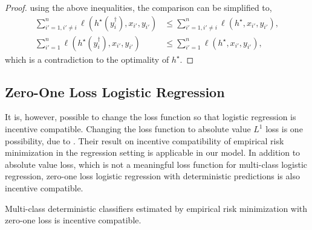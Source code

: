 \documentclass{article}
\begin{document}
\begin{proof}
using the above inequalities, the comparison can be simplified to,
\begin{align*}
\displaystyle\sum_{i'=1, i' \neq  i}^{n} \ell\left(h^\star \left(y^{\dagger}_{i}\right), x_{i'}, y_{i'}\right) &\leq  \displaystyle\sum_{i'=1, i' \neq  i}^{n} \ell\left(h^\star , x_{i'}, y_{i'}\right),
\\ \displaystyle\sum_{i'=1}^{n} \ell\left(h^\star \left(y^{\dagger}_{i}\right), x_{i'}, y_{i'}\right) &\leq  \displaystyle\sum_{i'=1}^{n} \ell\left(h^\star , x_{i'}, y_{i'}\right),
\end{align*}
which is a contradiction to the optimality of $h^\star $.
\newline \newline\end{proof}


\subsection{Zero-One Loss Logistic Regression}
It is, however, possible to change the loss function so that logistic regression is incentive compatible. Changing the loss function to absolute value $L^{1}$ loss is one possibility, due to \citet*{dekel2010incentive}. Their result on incentive compatibility of empirical risk minimization in the regression setting is applicable in our model. In addition to absolute value loss, which is not a meaningful loss function for multi-class logistic regression, zero-one loss logistic regression with deterministic predictions is also incentive compatible.
\newline \newline
\begin{prop} \label{prop:zolog} 
Multi-class deterministic classifiers estimated by empirical risk minimization with zero-one loss is incentive compatible.
\end{prop}
\end{document}
